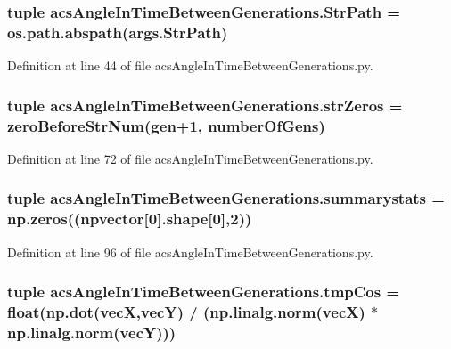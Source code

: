 \hypertarget{a00090_aadf83bb83f171da2e513401ece951083}{
\subsubsection[{Str\-Path}]{\setlength{\rightskip}{0pt plus 5cm}tuple acs\-Angle\-In\-Time\-Between\-Generations.\-Str\-Path = os.\-path.\-abspath(args.\-Str\-Path)}}\label{a00090_aadf83bb83f171da2e513401ece951083}


Definition at line 44 of file acs\-Angle\-In\-Time\-Between\-Generations.\-py.

\hypertarget{a00090_aa2b0aed68cf0d465add0d2683c686ff7}{
\subsubsection[{str\-Zeros}]{\setlength{\rightskip}{0pt plus 5cm}tuple acs\-Angle\-In\-Time\-Between\-Generations.\-str\-Zeros = {\bf zero\-Before\-Str\-Num}(gen+1, {\bf number\-Of\-Gens})}}\label{a00090_aa2b0aed68cf0d465add0d2683c686ff7}


Definition at line 72 of file acs\-Angle\-In\-Time\-Between\-Generations.\-py.

\hypertarget{a00090_ace6fb423ddbe7dd4b6e1d2828c8b05af}{
\subsubsection[{summarystats}]{\setlength{\rightskip}{0pt plus 5cm}tuple acs\-Angle\-In\-Time\-Between\-Generations.\-summarystats = np.\-zeros(({\bf npvector}\mbox{[}0\mbox{]}.shape\mbox{[}0\mbox{]},2))}}\label{a00090_ace6fb423ddbe7dd4b6e1d2828c8b05af}


Definition at line 96 of file acs\-Angle\-In\-Time\-Between\-Generations.\-py.

\hypertarget{a00090_afb0b11c375d9982cee623e5be776e6b1}{
\subsubsection[{tmp\-Cos}]{\setlength{\rightskip}{0pt plus 5cm}tuple acs\-Angle\-In\-Time\-Between\-Generations.\-tmp\-Cos = float(np.\-dot({\bf vec\-X},{\bf vec\-Y}) / (np.\-linalg.\-norm({\bf vec\-X}) $\ast$ np.\-linalg.\-norm({\bf vec\-Y})))}}\label{a00090_afb0b11c375d9982cee623e5be776e6b1}


